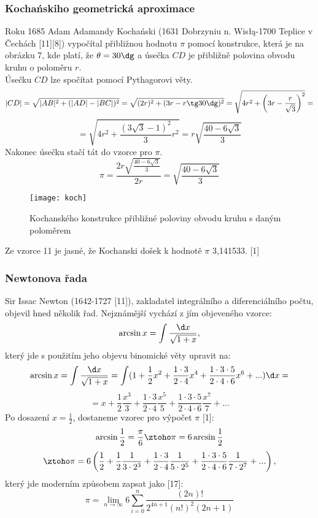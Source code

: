 \documentclass[rocnikovka]{gzwroc} %
\begin{document}
\subsubsection{Kochańskiho geometrická aproximace}
Roku 1685 Adam Adamandy Kochański (1631 Dobrzyniu n. Wisłą-1700 Teplice v Čechách [11][8]) vypočítal přibližnou hodnotu $\pi$ pomocí konstrukce, která je na obrázku 7, kde platí, že $\theta =30\dg$ a úsečka $CD$ je přibližně polovina obvodu kruhu o poloměru $r$.\\
Úsečku $CD$ lze spočítat pomocí Pythagorovi věty.
$$ |CD|=\sqrt{|AB|^2+(|AD|-|BC|)^2}=\sqrt{(2r)^2+(3r-r\tg 30\dg)^2} = \sqrt{4r^2+\left(3r-\frac{r}{\sqrt{3}}\right)^2}= $$
\begin{equation}
=\sqrt{4r^2+\frac{(3\sqrt{3}-1)^2}{3}r^2} = r\sqrt{\frac{40-6\sqrt{3}}{3}}
\end{equation}
Nakonec úsečku stačí tát do vzorce pro $\pi$.
\begin{equation}
\pi=\frac{2r\sqrt{\frac{40-6\sqrt{3}}{3}}}{2r}=\sqrt{\frac{40-6\sqrt{3}}{3}}
\end{equation}
\begin{figure}[!ht]
\texttt{[image: koch]}
\caption{Kochanského konstrukce přibližné poloviny obvodu kruhu s daným poloměrem}
\label{fig:kruh}
\end{figure}
Ze vzorce 11 je jasné, že Kochanski došek k hodnotě $\pi$ 3,141533. [1]
\subsubsection{Newtonova řada}
Sir Issac Newton (1642-1727 [11]), zakladatel integrálního a diferenciálního počtu, objevil hned několik řad. Nejznámější vychází z jím objeveného vzorce:
$$
\arcsin x = \int \frac{\d x}{\sqrt{1+x}},
$$
který jde s použitím jeho objevu binomické věty upravit na:
$$
\arcsin x = \int \frac{\d x}{\sqrt{1+x}}=\int(1+\frac{1}{2}x^2+\frac{1\cdot3}{2\cdot4}x^4+\frac{1\cdot3\cdot5}{2\cdot4\cdot6}x^6+...)\d x=
$$
\begin{equation}
=x+\frac{1}{2}\frac{x^3}{3}+\frac{1\cdot3}{2\cdot4}\frac{x^5}{5}+\frac{1\cdot3\cdot5}{2\cdot4\cdot6}\frac{x^7}{7}+...
\end{equation}
Po dosazení $x=\frac{1}{2}$, dostaneme vzorec pro výpočet $\pi$ [1]:
$$
\arcsin \frac{1}{2}=\frac{\pi}{6} \ztoho \pi=6\arcsin \frac{1}{2}
$$
\begin{equation}
\ztoho \pi=6\left(\frac{1}{2}+\frac{1}{2}\frac{1}{3\cdot2^3}+\frac{1\cdot3}{2\cdot4}\frac{1}{5\cdot2^5}+\frac{1\cdot3\cdot5}{2\cdot4\cdot6}\frac{1}{7\cdot2^7}+...\right),
\end{equation}
který jde moderním způsobem zapsat jako [17]:
\begin{equation}
\pi=\lim_{n\to\infty} 6\sum_{i=0}^{n} \frac{(2n)!}{2^{4n+1}(n!)^2(2n+1)}
\end{equation}
\end{document}
